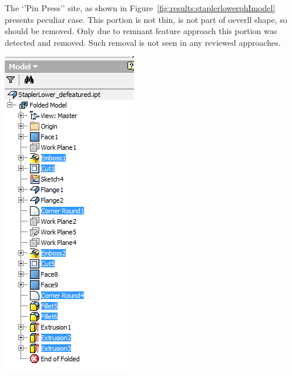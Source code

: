 \begin{minipage}{\linewidth}
\begin{minipage}[c]{0.62\linewidth}
The `'Pin Press'' site, as shown in Figure~\ref{fig:results:staplerlowerphImodel} presents peculiar case. This portion is not thin, is not part of oeverll shape, so should be removed. Only due to remnant feature approach this portion was detected and removed. Such removal is not seen in any reviewed approaches.
\end{minipage}
\quad
\begin{minipage}[c]{0.3\linewidth}
\includegraphics[width=\linewidth,valign=t]{images/StaplerLower_PhISelections_1_tree}
 \label{fig:results:staplerlowerphItree}
\end{minipage}
\end{minipage}

